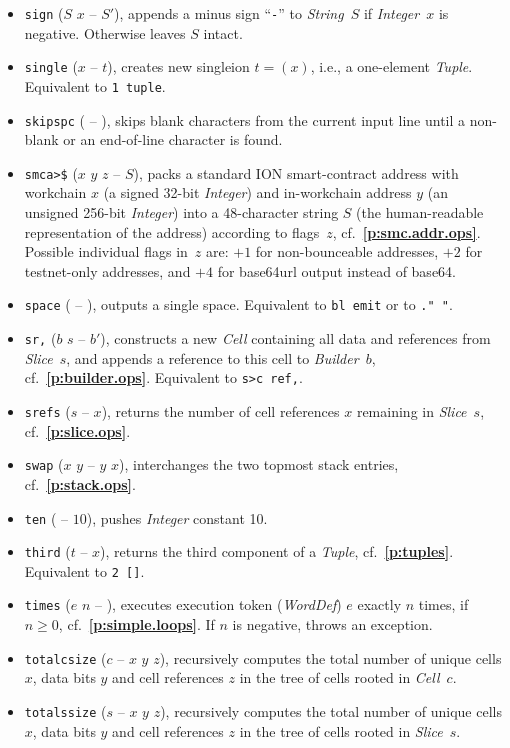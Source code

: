 \documentclass[12pt,oneside]{article}
\def\refpoint#1{{\rm\textbf{\ref{#1}}}}
\let\ptref=\refpoint
\begin{document}
\begin{itemize}
\item {\tt sign} ($S$ $x$ -- $S'$), appends a minus sign ``{\tt -}'' to {\em String\/}~$S$ if {\em Integer\/}~$x$ is negative. Otherwise leaves $S$ intact.
\item {\tt single} ($x$ -- $t$), creates new singleion $t=(x)$, i.e., a one-element {\em Tuple}. Equivalent to {\tt 1 tuple}.
\item {\tt skipspc} ( -- ), skips blank characters from the current input line until a non-blank or an end-of-line character is found.
\item {\tt smca>\$} ($x$ $y$ $z$ -- $S$), packs a standard ION smart-contract address with workchain $x$ (a signed 32-bit {\em Integer\/}) and in-workchain address $y$ (an unsigned 256-bit {\em Integer\/}) into a 48-character string $S$ (the human-readable representation of the address) according to flags~$z$, cf.~\ptref{p:smc.addr.ops}. Possible individual flags in~$z$ are: $+1$ for non-bounceable addresses, $+2$ for testnet-only addresses, and $+4$ for base64url output instead of base64.
\item {\tt space} ( -- ), outputs a single space. Equivalent to {\tt bl emit} or to {\tt ." "}.
\item {\tt sr,} ($b$ $s$ -- $b'$), constructs a new {\em Cell\/} containing all data and references from {\em Slice\/}~$s$, and appends a reference to this cell to {\em Builder}~$b$, cf.~\ptref{p:builder.ops}. Equivalent to {\tt s>c ref,}.
\item {\tt srefs} ($s$ -- $x$), returns the number of cell references $x$ remaining in {\em Slice}~$s$, cf.~\ptref{p:slice.ops}.
\item {\tt swap} ($x$ $y$ -- $y$ $x$), interchanges the two topmost stack entries, cf.~\ptref{p:stack.ops}.
\item {\tt ten} ( -- $10$), pushes {\em Integer\/} constant 10.
\item {\tt third} ($t$ -- $x$), returns the third component of a {\em Tuple}, cf.~\ptref{p:tuples}. Equivalent to {\tt 2 []}.
\item {\tt times} ($e$ $n$ -- ), executes execution token ({\em WordDef\/}) $e$ exactly $n$ times, if $n\geq0$, cf.~\ptref{p:simple.loops}. If $n$ is negative, throws an exception.
\item {\tt totalcsize} ($c$ -- $x$ $y$ $z$), recursively computes the total number of unique cells $x$, data bits $y$ and cell references $z$ in the tree of cells rooted in {\em Cell\/}~$c$.
\item {\tt totalssize} ($s$ -- $x$ $y$ $z$), recursively computes the total number of unique cells $x$, data bits $y$ and cell references $z$ in the tree of cells rooted in {\em Slice\/}~$s$.

\end{itemize}
\end{document}
